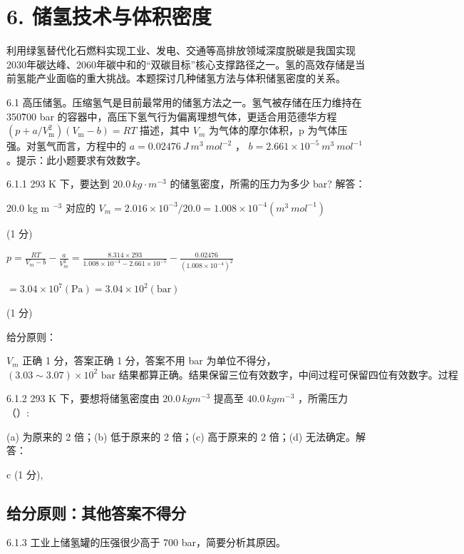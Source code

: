 \section*{6. 储氢技术与体积密度}
利用绿氢替代化石燃料实现工业、发电、交通等高排放领域深度脱碳是我国实现2030年碳达峰、2060年碳中和的“双碳目标”核心支撑路径之一。氢的高效存储是当前氢能产业面临的重大挑战。本题探讨几种储氢方法与体积储氢密度的关系。

6.1 高压储氢。压缩氢气是目前最常用的储氢方法之一。氢气被存储在压力维持在 350\~700 bar 的容器中，高压下氢气行为偏离理想气体，更适合用范德华方程 $(p+a/V_{\mathrm{m}}^{2})(V_{\mathrm{m}}-b)=RT$ 描述，其中 $V_{m}$ 为气体的摩尔体积，p 为气体压强。对氢气而言，方程中的 $a=0.02476\ J\ m^{3}\ mol^{-2}$ ， $b=2.661\times10^{-5}\ m^{3}\ mol^{-1}$ 。提示：此小题要求有效数字。

6.1.1 293 K 下，要达到 $20.0 \, kg \cdot m^{-3}$ 的储氢密度，所需的压力为多少 bar? 解答：

20.0 kg m $^{-3}$ 对应的 $V_{m}=2.016\times10^{-3}/20.0=1.008\times10^{-4}(m^{3}\ mol^{-1})$

(1 分)

$
p = \frac {R T}{V _ {m} - b} - \frac {a}{V _ {m} ^ {2}} = \frac {8 . 3 1 4 \times 2 9 3}{1 . 0 0 8 \times 1 0 ^ {- 4} - 2 . 6 6 1 \times 1 0 ^ {- 5}} - \frac {0 . 0 2 4 7 6}{(1 . 0 0 8 \times 1 0 ^ {- 4}) ^ {2}}
$

$
= 3. 0 4 \times 1 0 ^ {7} (\mathrm{Pa}) = 3. 0 4 \times 1 0 ^ {2} (\mathrm{bar})
$

(1 分)

给分原则：

$V_{m}$ 正确 1 分，答案正确 1 分，答案不用 bar 为单位不得分， $(3.03 \sim 3.07) \times 10^{2} \text{ bar 结果都算正确。结果保留三位有效数字，中间过程可保留四位有效数字。过程正确，答案有效数字错误，扣 1 分，无代入数据扣 1 分。}$

6.1.2 293 K 下，要想将储氢密度由 $20.0 \, kg m^{-3}$ 提高至 $40.0 \, kg m^{-3}$ ，所需压力（）:

(a) 为原来的 2 倍；(b) 低于原来的 2 倍；(c) 高于原来的 2 倍；(d) 无法确定。解答：

c (1 分),

\subsection*{给分原则：其他答案不得分}

6.1.3 工业上储氢罐的压强很少高于 700 bar，简要分析其原因。

